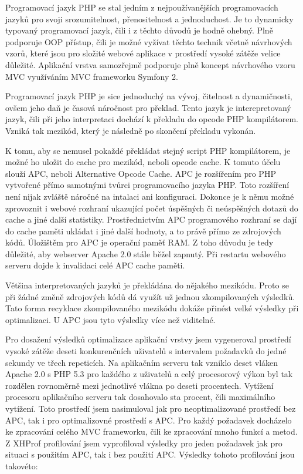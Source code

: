 \documentclass[12pt]{article}
\begin{document}
Programovací jazyk PHP se stal jedním z nejpoužívanějších programovacích jazyků pro svoji srozumitelnost, přenositelnost a jednoduchost. Je to dynamicky typovaný programovací jazyk, čili i z těchto důvodů je hodně ohebný. Plně podporuje OOP přístup, čili je možné vyžívat těchto technik včetně návrhových vzorů, které jsou pro složité webové aplikace v prostředí vysoké zátěže velice důležité. Aplikační vrstva samozřejmě podporuje plně koncept návrhového vzoru MVC využíváním MVC frameworku Symfony 2.


\label{sec:optim-apc}
Programovací jazyk PHP je sice jednoduchý na vývoj, čitelnost a dynamičnosti, ovšem jeho daň je časová náročnost pro překlad. Tento jazyk je interepretovaný jazyk, čili při jeho interpretaci dochází k překladu do opcode PHP kompilátorem. Vzniká tak mezikód, který je následně po skončení překladu vykonán.

K tomu, aby se nemusel pokaždé překládat stejný script PHP kompilátorem, je možné ho uložit do cache pro mezikód, neboli opcode cache. K tomuto účelu slouží APC, neboli Alternative Opcode Cache. APC je rozšířením pro PHP vytvořené přímo samotnými tvůrci programovacího jazyka PHP. Toto rozšíření není nijak zvláště náročné na intalaci ani konfiguraci. Dokonce je k němu možné zprovoznit i webové rozhraní ukazující počet úspěšných či neúspěšných dotazů do cache a jiné další statistiky. Prostřednictvím APC programového rozhraní se dají do cache paměti ukládat i jiné další hodnoty, a to právě přímo ze zdrojových kódů. Úložištěm pro APC je operační paměť RAM. Z toho důvodu je tedy důležité, aby webserver Apache 2.0 stále běžel zapnutý. Při restartu webového serveru dojde k invalidaci celé APC cache paměti.\cite{apc}

Většina interpretovaných jazyků je překládána do nějakého mezikódu. Proto se při žádné změně zdrojových kódů dá využít už jednou zkompilovaných výsledků. Tato forma recyklace zkompilovaného mezikódu dokáže přinést velké výsledky při optimalizaci. U APC jsou tyto výsledky více než viditelné.

Pro dosažení výsledků optimalizace aplikační vrstvy jsem vygeneroval prostředí vysoké zátěže deseti konkurenčních uživatelů s intervalem požadavků do jedné sekundy ve třech repeticích. Na aplikačním serveru tak vzniklo deset vláken Apache 2.0 s PHP 5.3 pro každého z uživatelů a celý procesorový výkon byl tak rozdělen rovnoměrně mezi jednotlivé vlákna po deseti procentech. Vytížení procesoru aplikačního serveru tak dosahovalo sta procent, čili maximálního vytížení. Toto prostředí jsem nasimuloval jak pro neoptimalizované prostředí bez APC, tak i pro optimalizovné prostředí s APC. Pro každý požadavek docházelo ke zpracování celého MVC frameworku, čili ke zpracování mnoho funkcí a metod. Z XHProf profilování jsem vyprofiloval výsledky pro jeden požadavek jak pro situaci s použitím APC, tak i bez použití APC. Výsledky tohoto profilování jsou takovéto:
\end{document}
